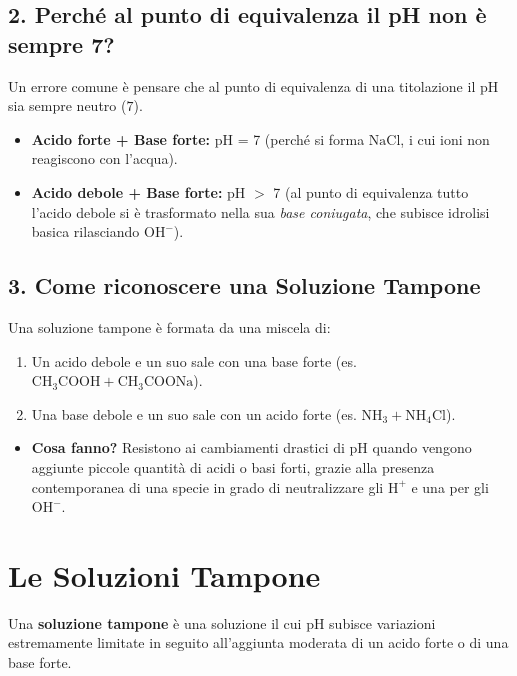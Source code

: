 \documentclass[11pt, a4paper, openright]{book}
\begin{document}
\subsection{2. Perché al punto di equivalenza il pH non è sempre 7?}
Un errore comune è pensare che al punto di equivalenza di una titolazione il pH sia sempre neutro ($7$). 
\begin{itemize}
    \item \textbf{Acido forte + Base forte:} pH = 7 (perché si forma $\text{NaCl}$, i cui ioni non reagiscono con l'acqua).
    \item \textbf{Acido debole + Base forte:} pH $>$ 7 (al punto di equivalenza tutto l'acido debole si è trasformato nella sua \textit{base coniugata}, che subisce idrolisi basica rilasciando $\text{OH}^-$).
\end{itemize}
\subsection{3. Come riconoscere una Soluzione Tampone}
Una soluzione tampone è formata da una miscela di:
\begin{enumerate}
    \item Un acido debole e un suo sale con una base forte (es. $\text{CH}_3\text{COOH} + \text{CH}_3\text{COONa}$).
    \item Una base debole e un suo sale con un acido forte (es. $\text{NH}_3 + \text{NH}_4\text{Cl}$).
\end{enumerate}
\begin{itemize}
    \item \textbf{Cosa fanno?} Resistono ai cambiamenti drastici di pH quando vengono aggiunte piccole quantità di acidi o basi forti, grazie alla presenza contemporanea di una specie in grado di neutralizzare gli $\text{H}^+$ e una per gli $\text{OH}^-$.
\end{itemize}

\section{Le Soluzioni Tampone}
Una \textbf{soluzione tampone} è una soluzione il cui pH subisce variazioni estremamente limitate in seguito all'aggiunta moderata di un acido forte o di una base forte. 
\end{document}
